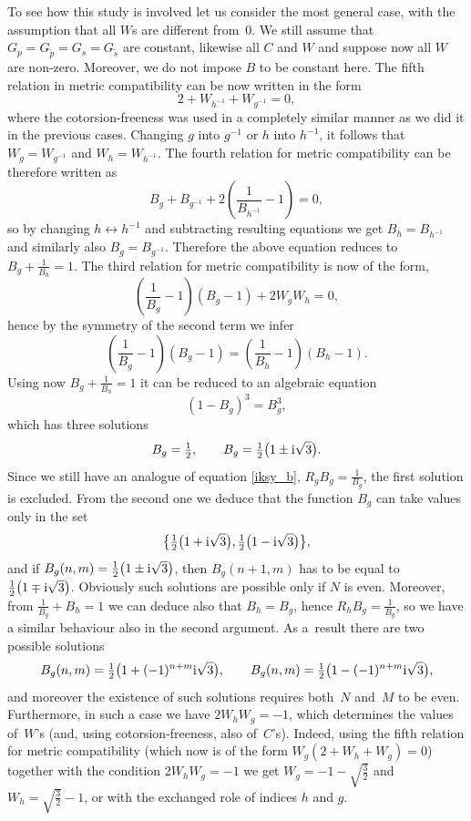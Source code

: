 \documentclass[10pt,a4paper]{amsart}
\numberwithin{equation}{section}
\newcommand{\ip}{{\tilde{p}}}
\newcommand{\is}{{\tilde{s}}}
\begin{document}
To see how this study is involved let us consider the most general case, with the assumption that all $W$s are different
from~$0$. We still assume that $G_p=G_\ip = G_s=G_\is$ are constant, likewise all $C$ and $W$ and suppose now all $W$ are
non-zero. Moreover, we do not impose $B$ to be constant here. The fifth relation in metric compatibility can be now written in the form
\begin{equation*}%
 2+W_{h^{-1}}+W_{g^{-1}}=0,
\end{equation*}
where the cotorsion-freeness was used in a completely similar manner as we did it in the previous cases. Changing $g$ into $g^{-1}$ or $h$ into $h^{-1}$, it follows that $W_g=W_{g^{-1}}$ and $W_{h}=W_{h^{-1}}$. The fourth relation for metric compatibility can be therefore written as
\[ B_g + B_{g^{-1}}+2\left(\frac{1}{B_{h^{-1}}}-1\right)=0, \] so by changing $h\leftrightarrow h^{-1}$ and subtracting resulting equations
we get $B_h=B_{h^{-1}}$ and similarly also $B_g=B_{g^{-1}}$. Therefore the above equation reduces to $B_g+\frac{1}{B_h}=1$.
The third relation for metric compatibility is now of the form,
\begin{equation*}%
\left(\frac{1}{B_g}-1\right)(B_g-1)+2W_gW_h=0,
\end{equation*}
hence by the symmetry of the second term we infer
\[ \left(\frac{1}{B_g}-1\right)(B_g-1)=\left(\frac{1}{B_h}-1\right)(B_h-1).\]
Using now $B_g+\frac{1}{B_h}=1$ it can be reduced to an algebraic equation
\[(1-B_g)^3=B_g^3,\]
which has three solutions
\[ B_g=\tfrac{1}{2}, \qquad B_g=\tfrac{1}{2}\big(1\pm {\rm i}\sqrt{3}\big).\]
Since we still have an analogue of equation \eqref{iksy_b}, $R_gB_g=\frac{1}{B_g}$, the first solution is excluded. From the second one we deduce that the function $B_g$ can take values only in the set
\[ \big\{\tfrac{1}{2}\big(1+ {\rm i}\sqrt{3}\big), \tfrac{1}{2}\big(1- {\rm i}\sqrt{3}\big)\big\},\] and if $B_g(n,m)=\frac{1}{2}\big(1\pm {\rm i}\sqrt{3}\big)$, then $B_g(n+1,m)$ has to be equal to $\frac{1}{2}\big(1\mp {\rm i}\sqrt{3}\big)$. Obviously such solutions are possible only if $N$ is even. Moreover, from $\frac{1}{B_g}+B_h=1$ we can deduce also that $B_h=B_g$, hence $R_hB_g=\frac{1}{B_g}$, so we have a similar behaviour also in the second argument. As a~result there are two possible solutions
\[ B_g(n,m)=\tfrac{1}{2}\big(1+(-1)^{n+m}{\rm i}\sqrt{3}\big),\qquad B_g(n,m)=\tfrac{1}{2}\big(1-(-1)^{n+m}{\rm i}\sqrt{3}\big),\]
and moreover the existence of such solutions requires both~$N$ and~$M$ to be even. Furthermore, in such a case we have $2W_hW_g=-1$, which determines the values of~$W$'s (and, using cotorsion-freeness, also of~$C$'s). Indeed, using the fifth relation for metric compatibility (which now is of the form $W_g(2+W_h+W_g)=0$) together with the condition $2W_hW_g=-1$ we get $W_g=-1-\sqrt{\frac{3}{2}}$ and $W_h=\sqrt{\frac{3}{2}}-1$, or with the exchanged role of indices $h$ and $g$.
\end{document}
